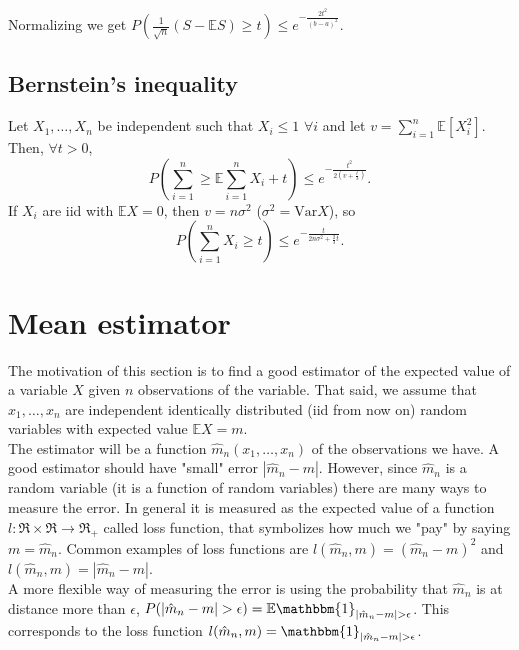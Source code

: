 \documentclass[11pt, english]{article}
\begin{document}
Normalizing we get $P(\frac{1}{\sqrt{n}}(S-\mathbb{E}S)\geq t)\leq e^{-\frac{2t^2}{(b-a)^2}}$.

\subsection*{Bernstein's inequality}

Let $X_1,\dots,X_n$ be independent such that $X_i\leq 1$ $\forall i$ and let $v=\sum\limits_{i=1}^n\mathbb{E}[X_i^2]$. Then, $\forall t>0$,
\begin{equation}
	P(\sum\limits_{i=1}^n\geq\mathbb{E}\sum\limits_{i=1}^n X_i+t)\leq e^{-\frac{t^2}{2(v+\frac{t}{3})}}.
\end{equation}
If $X_i$ are iid with $\mathbb{E}X=0$, then $v=n\sigma^2$ ($\sigma^2=\text{Var}X$), so
\begin{equation}
	P(\sum\limits_{i=1}^n X_i\geq t)\leq e^{-\frac{t}{2n\sigma^2+\frac{2}{3}t}}.
\end{equation} 




\section{Mean estimator}


The motivation of this section is to find a good estimator of the expected value of a variable $X$ given $n$ observations of the variable. That said, we assume that $x_1,\dots,x_n$ are independent identically distributed (iid from now on) random variables with expected value $\mathbb{E}X=m$.\\

The estimator will be a function $\hat{m}_n(x_1,\dots,x_n)$ of the observations we have. A good estimator should have "small" error $|\hat{m}_n-m|$. However, since $\hat{m}_n$ is a random variable (it is a function of random variables) there are many ways to measure the error. In general it is measured as the expected value of a function $l:\Re\times\Re\rightarrow\Re_+$ called loss function, that symbolizes how much we "pay" by saying $m=\hat{m}_n$. Common examples of loss functions are $l(\hat{m}_n,m)=(\hat{m}_n-m)^2$ and $l(\hat{m}_n,m)=|\hat{m}_n-m|$. \\
A more flexible way of measuring the error is using the probability that $\hat{m}_n$ is at distance more than $\epsilon$, $P(|\hat{m}_n-m|>\epsilon)=\mathbb{E}\mathbbm{1}_{|\hat{m}_n-m|>\epsilon}$. This corresponds to the loss function $l(\hat{m}_n,m)=\mathbbm{1}_{|\hat{m}_n-m|>\epsilon}$.\\
\end{document}
